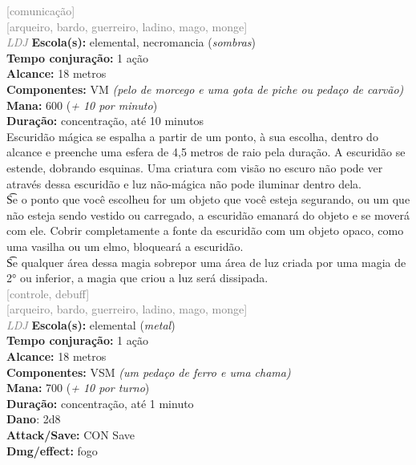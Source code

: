 \documentclass{RPG_Adventure}[2021/10/20]
\begin{document}
{\scriptsize \textcolor{gray}{[comunicação]\\}}
{\scriptsize \textcolor{gray}{[arqueiro, bardo, guerreiro, ladino, mago, monge]\\}}
{\tiny \textcolor{gray}{\textit{LDJ}}}\jump{}
{\small \t \textbf{Escola(s):} elemental, necromancia (\textit{sombras})\\\t \textbf{Tempo conjuração:} 1 ação\\\t \textbf{Alcance:} 18 metros\\\t \textbf{Componentes:} VM \textit{(pelo de morcego e uma gota de piche ou pedaço de carvão)}\\\t \textbf{Mana:} 600 (\textit{+ 10 por minuto})\\\t \textbf{Duração:} concentração, até 10 minutos\\}
{\normalsize Escuridão mágica se espalha a partir de um ponto, à sua escolha, dentro do alcance e preenche uma esfera de 4,5 metros de raio pela duração. A escuridão se estende, dobrando esquinas. Uma criatura com visão no escuro não pode ver através dessa escuridão e luz não-mágica não pode iluminar dentro dela.\\\t Se o ponto que você escolheu for um objeto que você esteja segurando, ou um que não esteja sendo vestido ou carregado, a escuridão emanará do objeto e se moverá com ele. Cobrir completamente a fonte da escuridão com um objeto opaco, como uma vasilha ou um elmo, bloqueará a escuridão.\\\t Se qualquer área dessa magia sobrepor uma área de luz criada por uma magia de 2° ou inferior, a magia que criou a luz será dissipada.\\}
{\scriptsize \textcolor{gray}{[controle, debuff]\\}}
{\scriptsize \textcolor{gray}{[arqueiro, bardo, guerreiro, ladino, mago, monge]\\}}
{\tiny \textcolor{gray}{\textit{LDJ}}}\jump{}
{\small \t \textbf{Escola(s):} elemental (\textit{metal})\\\t \textbf{Tempo conjuração:} 1 ação\\\t \textbf{Alcance:} 18 metros\\\t \textbf{Componentes:} VSM \textit{(um pedaço de ferro e uma chama)}\\\t \textbf{Mana:} 700 (\textit{+ 10 por turno})\\\t \textbf{Duração:} concentração, até 1 minuto\\\t \textbf{Dano}: 2d8\\\t \textbf{Attack/Save:} CON Save\\\t \textbf{Dmg/effect:} fogo\\}
\end{document}
